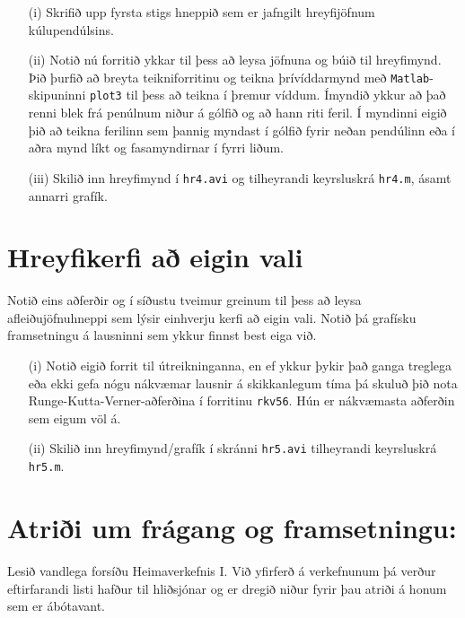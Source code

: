 \documentclass[11pt,icelandic]{article}
\begin{document}
\smallskip
\begin{enumerate}
\item [(i)]  Skrifið upp fyrsta stigs hneppið sem er jafngilt
hreyfijöfnum kúlupendúlsins.
\item [(ii)] Notið nú forritið ykkar til þess að leysa jöfnuna og búið
til hreyfimynd.  Þið þurfið að breyta teikniforritinu og teikna
þrívíddarmynd með {\tt Matlab}-skipuninni {\tt plot3} til þess að 
teikna í þremur víddum.  Ímyndið ykkur að það renni blek frá penúlnum
niður á gólfið og að hann riti feril.   Í myndinni eigið þið 
að teikna ferilinn sem þannig myndast í gólfið fyrir neðan pendúlinn 
eða í aðra mynd líkt og fasamyndirnar í fyrri liðum.
\item [(iii)]  Skilið inn hreyfimynd  í {\tt hr4.avi}
og tilheyrandi keyrsluskrá {\tt hr4.m}, ásamt annarri grafík. 
\end{enumerate}

\section{ Hreyfikerfi að eigin vali}

Notið eins  aðferðir og í síðustu tveimur greinum til þess að
leysa afleiðujöfnuhneppi sem lýsir einhverju kerfi að eigin vali.
Notið þá grafísku framsetningu á lausninni sem ykkur finnst best eiga
við. 
\begin{enumerate}
\item [(i)] Notið eigið forrit til útreikninganna, en ef ykkur þykir
það ganga treglega eða ekki gefa nógu nákvæmar lausnir á skikkanlegum
tíma þá skuluð þið nota Runge-Kutta-Verner-aðferðina í forritinu
{\tt rkv56}.  Hún er nákvæmasta aðferðin sem eigum völ á.
\item [(ii)]  Skilið inn hreyfimynd/grafík  í skránni {\tt hr5.avi}
tilheyrandi keyrsluskrá {\tt hr5.m}. 
\end{enumerate}







\section*{Atriði um frágang og framsetningu:}  Lesið vandlega
forsíðu Heimaverkefnis I.  
Við yfirferð á verkefnunum þá verður eftirfarandi listi hafður til hliðsjónar
og er dregið niður fyrir þau atriði á honum sem er ábótavant.
\end{document}
